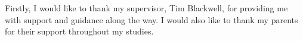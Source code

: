 \begin{acknowledgements}
\addchaptertocentry{\acknowledgementname} %
Firstly, I would like to thank my supervisor, Tim Blackwell, for providing me with support and guidance along the way. I would also like to thank my parents for their support throughout my studies.
\end{acknowledgements}

